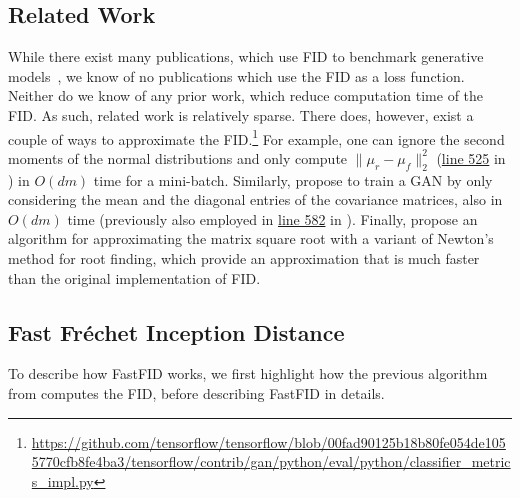 \documentclass[11pt,a4paper,twoside,openright,final]{memoir}
\makeatletter
\newcommand\footnoteref[1]{\protected@xdef\@thefnmark{\ref{#1}}\@footnotemark}
\makeatother
\begin{document}
\subsection{Related Work}
While there exist many publications, which use FID to benchmark generative models~\cite{fid-comparison, saganfid, biggan, dcgan}, we know of no publications which use the FID as a loss function.
Neither do we know of any prior work, which reduce computation time of the FID.
As such, related work is relatively sparse.
There does, however, exist a couple of ways to approximate the FID.\footnote{\label{fn:tf}\url{https://github.com/tensorflow/tensorflow/blob/00fad90125b18b80fe054de1055770cfb8fe4ba3/tensorflow/contrib/gan/python/eval/python/classifier_metrics_impl.py}}
For example, one can ignore the second moments of the normal distributions and only compute $\|\mu_r-\mu_f\|_2^2$ (\href{https://github.com/tensorflow/tensorflow/blob/00fad90125b18b80fe054de1055770cfb8fe4ba3/tensorflow/contrib/gan/python/eval/python/classifier_metrics_impl.py#L525}{line 525} in \footnoteref{fn:tf}) in $O(dm)$ time for a mini-batch.
Similarly, \citet{approximate-fid} propose to train a GAN by only considering the mean and the diagonal entries of the covariance matrices, also in $O(dm)$ time (previously also employed in \href{https://github.com/tensorflow/tensorflow/blob/00fad90125b18b80fe054de1055770cfb8fe4ba3/tensorflow/contrib/gan/python/eval/python/classifier_metrics_impl.py#L582}{line 582} in \footnoteref{fn:tf}).
Finally, \citet{fid-approx} propose an algorithm for approximating the matrix square root with a variant of Newton's method for root finding, which provide an approximation that is much faster than the original implementation of FID.


\subsection{Fast Fr\'echet Inception Distance} 
To describe how FastFID works, we first highlight how the previous algorithm from \cite{fid} computes the FID, before describing FastFID in details.
\end{document}
